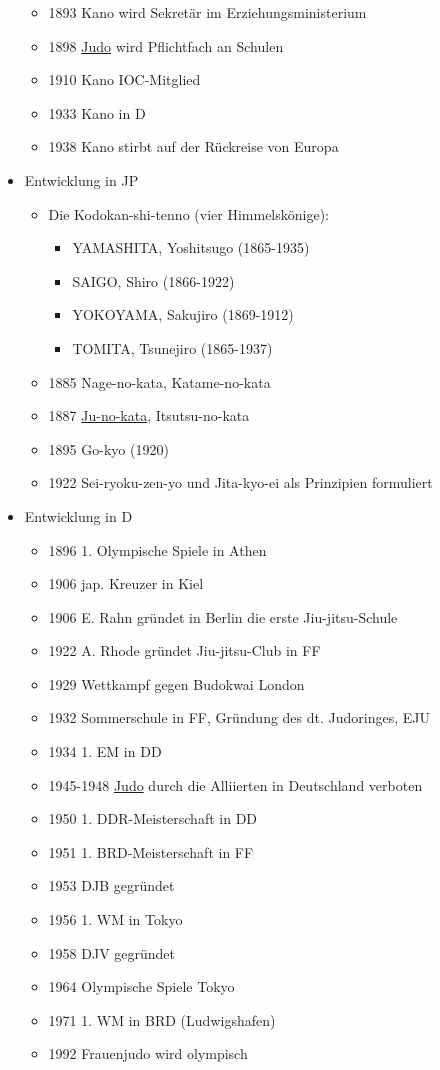 \documentclass[justified, a4paper, notitlepage, captions=tableheading, nobib]{tufte-handout}
\begin{document}
\begin{itemize}
\begin{itemize}
\item 1893 Kano wird Sekretär im Erziehungsministerium
\item 1898 \hyperref[org60aba15]{Judo} wird Pflichtfach an Schulen
\item 1910 Kano IOC-Mitglied
\item 1933 Kano in D
\item 1938 Kano stirbt auf der Rückreise von Europa
\end{itemize}
\item Entwicklung in JP
\begin{itemize}
\item Die Kodokan-shi-tenno (vier Himmelskönige):
\begin{itemize}
\item YAMASHITA, Yoshitsugo (1865-1935)
\item SAIGO, Shiro (1866-1922)
\item YOKOYAMA, Sakujiro (1869-1912)
\item TOMITA, Tsunejiro (1865-1937)
\end{itemize}
\item 1885 Nage-no-kata, Katame-no-kata
\item 1887 \hyperref[orgd6be93b]{Ju-no-kata}, Itsutsu-no-kata
\item 1895 Go-kyo (1920)
\item 1922 Sei-ryoku-zen-yo und Jita-kyo-ei als Prinzipien formuliert
\end{itemize}
\item Entwicklung in D
\begin{itemize}
\item 1896 1. Olympische Spiele in Athen
\item 1906 jap. Kreuzer in Kiel
\item 1906 E. Rahn gründet in Berlin die erste Jiu-jitsu-Schule
\item 1922 A. Rhode gründet Jiu-jitsu-Club in FF
\item 1929 Wettkampf gegen Budokwai London
\item 1932 Sommerschule in FF, Gründung des dt. Judoringes, EJU
\item 1934 1. EM in DD
\item 1945-1948 \hyperref[org60aba15]{Judo} durch die Alliierten in Deutschland verboten
\item 1950 1. DDR-Meisterschaft in DD
\item 1951 1. BRD-Meisterschaft in FF
\item 1953 DJB gegründet
\item 1956 1. WM in Tokyo
\item 1958 DJV gegründet
\item 1964 Olympische Spiele Tokyo
\item 1971 1. WM in BRD (Ludwigshafen)
\item 1992 Frauenjudo wird olympisch
\end{itemize}
\end{itemize}
\end{document}
